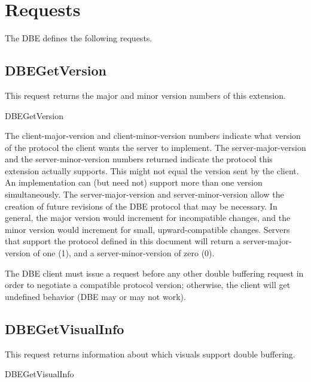 \section{Requests}

The DBE defines the following requests.

\subsection{DBEGetVersion}

This request returns the major and minor version numbers of this
extension.

\begin{arequest}{DBEGetVersion}
\areply
{}
\end{arequest}

The client-major-version and client-minor-version
numbers indicate what version of the protocol the client wants the
server to implement.  The server-major-version and the
server-minor-version numbers returned indicate the protocol
this extension actually supports.  This might not equal the version
sent by the client.  An implementation can (but need not) support more
than one version simultaneously.  The server-major-version
and server-minor-version allow the creation of future
revisions of the DBE protocol that may be
necessary.  In general, the major version would increment for
incompatible changes, and the minor version would increment for small,
upward-compatible changes.  Servers that support the protocol defined
in this document will return a server-major-version of one
(1), and a server-minor-version of zero (0).

The DBE client must issue a 
request before any other double buffering request in order to
negotiate a compatible protocol version; otherwise, the client will get
undefined behavior (DBE may or may not work).

\subsection{DBEGetVisualInfo}

This request returns information about which visuals support double
buffering.

\begin{arequest}{DBEGetVisualInfo}
\areply
{}
\end{arequest}

